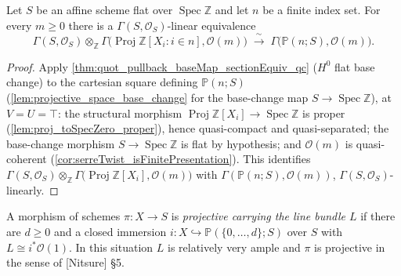 \begin{theorem}
  \label{thm:serreTwist_sections_baseChange}
  Let \(S\) be an affine scheme flat over \(\operatorname{Spec}
  \mathbb{Z}\) and let \(n\) be a finite index set. For every \(m \ge
  0\) there is a \(\Gamma(S, \mathcal{O}_S)\)-linear equivalence
  \[
    \Gamma(S, \mathcal{O}_S) \otimes_{\mathbb{Z}}
      \Gamma\bigl(\operatorname{Proj} \mathbb{Z}[X_i : i \in n],
      \mathcal{O}(m)\bigr)
    \;\xrightarrow{\ \sim\ }\;
    \Gamma\bigl(\mathbb{P}(n; S), \mathcal{O}(m)\bigr).
  \]
\end{theorem}
\begin{proof}\leanok
  Apply \cref{thm:quot_pullback_baseMap_sectionEquiv_qc} (\(H^0\) flat
  base change) to the cartesian square defining \(\mathbb{P}(n; S)\)
  (\cref{lem:projective_space_base_change} for the base-change map
  \(S \to \operatorname{Spec} \mathbb{Z}\)), at \(V = U = \top\): the
  structural morphism
  \(\operatorname{Proj} \mathbb{Z}[X_i] \to \operatorname{Spec}
  \mathbb{Z}\) is proper (\cref{lem:proj_toSpecZero_proper}), hence
  quasi-compact and quasi-separated; the base-change morphism
  \(S \to \operatorname{Spec} \mathbb{Z}\) is flat by hypothesis; and
  \(\mathcal{O}(m)\) is quasi-coherent
  (\cref{cor:serreTwist_isFinitePresentation}). This identifies
  \(\Gamma(S, \mathcal{O}_S) \otimes_{\mathbb{Z}} \Gamma\bigl(
  \operatorname{Proj} \mathbb{Z}[X_i], \mathcal{O}(m)\bigr)\) with
  \(\Gamma(\mathbb{P}(n; S), \mathcal{O}(m))\), \(\Gamma(S,
  \mathcal{O}_S)\)-linearly.
\end{proof}

\begin{definition}
  \label{def:projective_with}
  \leanok
  A morphism of schemes \(\pi : X \to S\) is \emph{projective carrying the
  line bundle \(L\)} if there are \(d \ge 0\) and a closed immersion
  \(i : X \hookrightarrow \mathbb{P}(\{0,\dots,d\}; S)\) over \(S\) with
  \(L \cong i^* \mathcal{O}(1)\).  In this situation \(L\) is relatively
  very ample and \(\pi\) is projective in the sense of [Nitsure] \S 5.
\end{definition}

